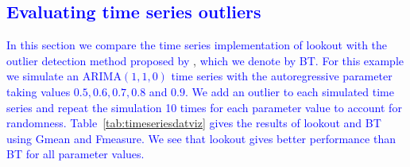\documentclass[12pt]{article}
\theoremstyle{definition}
\theoremstyle{definition}
\theoremstyle{definition}
\theoremstyle{definition}
\theoremstyle{remark}
\begin{document}
\hypertarget{section-1}{%
\subsection*{\texorpdfstring{\textcolor{blue}{Evaluating time series outliers }}{}}\label{section-1}}

\textcolor{blue}{
In this section we compare the time series implementation of lookout with the outlier detection method proposed by } \citet{Burridge2006}, \textcolor{blue}{which we denote by BT. For this example we simulate an ARIMA$(1, 1, 0)$ time series with the autoregressive parameter taking values $0.5, 0.6, 0.7, 0.8$ and $0.9$. We add an outlier to each simulated time series and repeat the simulation 10 times for each parameter value to account for randomness. Table~\ref{tab:timeseriesdatviz} gives the results of lookout and BT using Gmean and Fmeasure. We see that lookout gives better performance than BT for all parameter values.
}
\end{document}
